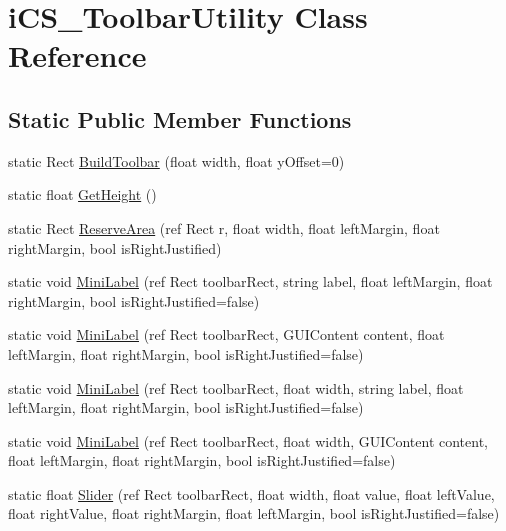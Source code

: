 \hypertarget{classi_c_s___toolbar_utility}{\section{i\+C\+S\+\_\+\+Toolbar\+Utility Class Reference}
\label{classi_c_s___toolbar_utility}
}
\subsection*{Static Public Member Functions}
\begin{DoxyCompactItemize}
\item 
static Rect \hyperlink{classi_c_s___toolbar_utility_a62457a59c978819a82ec9f7fd60a1a95}{Build\+Toolbar} (float width, float y\+Offset=0)
\item 
static float \hyperlink{classi_c_s___toolbar_utility_addea9b3928e51a346ba29a70588981f1}{Get\+Height} ()
\item 
static Rect \hyperlink{classi_c_s___toolbar_utility_a674a89a7a80de041cec5da6b2fb8f17b}{Reserve\+Area} (ref Rect r, float width, float left\+Margin, float right\+Margin, bool is\+Right\+Justified)
\item 
static void \hyperlink{classi_c_s___toolbar_utility_a43922ba1c7669e5586d3c25d98856c8d}{Mini\+Label} (ref Rect toolbar\+Rect, string label, float left\+Margin, float right\+Margin, bool is\+Right\+Justified=false)
\item 
static void \hyperlink{classi_c_s___toolbar_utility_a423407286ff3970f2d29e7bacc770452}{Mini\+Label} (ref Rect toolbar\+Rect, G\+U\+I\+Content content, float left\+Margin, float right\+Margin, bool is\+Right\+Justified=false)
\item 
static void \hyperlink{classi_c_s___toolbar_utility_aa8a752db8e5546b004e44217aaf58bab}{Mini\+Label} (ref Rect toolbar\+Rect, float width, string label, float left\+Margin, float right\+Margin, bool is\+Right\+Justified=false)
\item 
static void \hyperlink{classi_c_s___toolbar_utility_acf9c0cc392cda323f1e08bd46e71c251}{Mini\+Label} (ref Rect toolbar\+Rect, float width, G\+U\+I\+Content content, float left\+Margin, float right\+Margin, bool is\+Right\+Justified=false)
\item 
static float \hyperlink{classi_c_s___toolbar_utility_aaa7e5431fa49419a7ca62a3d7f7d6c76}{Slider} (ref Rect toolbar\+Rect, float width, float value, float left\+Value, float right\+Value, float right\+Margin, float left\+Margin, bool is\+Right\+Justified=false)

\end{DoxyCompactItemize}
